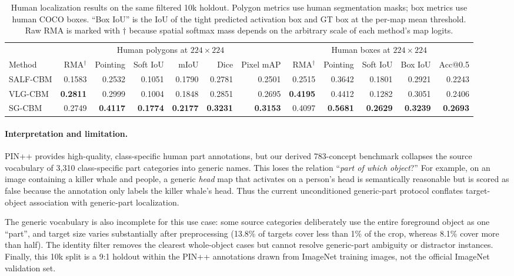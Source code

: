 \begin{table}[t]
\centering
\caption{Human localization results on the same filtered 10k holdout.  Polygon
metrics use human segmentation masks; box metrics use human COCO boxes.
``Box IoU'' is the IoU of the tight predicted activation box and GT box at the
per-map mean threshold.  Raw RMA is marked with $\dagger$ because spatial
softmax mass depends on the arbitrary scale of each method's map logits.}
\label{tab:pinpp-localization}
\small
\setlength{\tabcolsep}{5pt}
\begin{tabular}{lrrrrrr|rrrrr}
\toprule
& \multicolumn{6}{c|}{Human polygons at $224\times224$}
& \multicolumn{5}{c}{Human boxes at $224\times224$} \\
\cmidrule(lr){2-7}\cmidrule(l){8-12}
Method & RMA$^\dagger$ & Pointing & Soft IoU & mIoU & Dice & Pixel mAP
& RMA$^\dagger$ & Pointing & Soft IoU & Box IoU & Acc@0.5 \\
\midrule
SALF-CBM & 0.1583 & 0.2532 & 0.1051 & 0.1790 & 0.2781 & 0.2501
& 0.2515 & 0.3642 & 0.1801 & 0.2921 & 0.2243 \\
VLG-CBM & \textbf{0.2811} & 0.2999 & 0.1004 & 0.1848 & 0.2851 & 0.2695
& \textbf{0.4195} & 0.4412 & 0.1282 & 0.3051 & 0.2406 \\
SG-CBM & 0.2749 & \textbf{0.4117} & \textbf{0.1774} & \textbf{0.2177} & \textbf{0.3231} & \textbf{0.3153}
& 0.4097 & \textbf{0.5681} & \textbf{0.2629} & \textbf{0.3239} & \textbf{0.2693} \\
\bottomrule
\end{tabular}
\end{table}

\paragraph{Interpretation and limitation.}
PIN++ provides high-quality, class-specific human part annotations, but our
derived 783-concept benchmark collapses the source vocabulary of 3,310
class-specific part categories into generic names.  This loses the relation
``\emph{part of which object}?''  For example, on an image containing a killer
whale and people, a generic \emph{head} map that activates on a person's head
is semantically reasonable but is scored as false because the annotation only
labels the killer whale's head.  Thus the current unconditioned generic-part
protocol conflates target-object association with generic-part localization.

The generic vocabulary is also incomplete for this use case: some source
categories deliberately use the entire foreground object as one ``part'', and
target size varies substantially after preprocessing (13.8\% of targets cover
less than 1\% of the crop, whereas 8.1\% cover more than half).  The identity
filter removes the clearest whole-object cases but cannot resolve generic-part
ambiguity or distractor instances.  Finally, this 10k split is a 9:1 holdout
within the PIN++ annotations drawn from ImageNet training images, not the
official ImageNet validation set.

